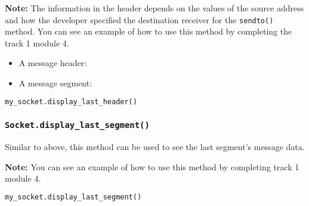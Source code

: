\documentclass[11pt]{article}
\begin{document}
\textbf{Note:}
The information in the header depends on the values of the source address and how the developer specified the destination receiver for the \texttt{sendto()} method.
You can see an example of how to use this method by completing the track 1 module 4.

\begin{itemize}
    \item A message header:

    \item A message segment:
\end{itemize}

\begin{lstlisting}[caption={Example for using \texttt{display\_last\_header()}}, language=Python]
my_socket.display_last_header()
\end{lstlisting}

\subsubsection{\texttt{Socket.display\_last\_segment()}}
Similar to above, this method can be used to see the last segment's message data.

\textbf{Note:}
You can see an example of how to use this method by completing track 1 module 4.

\begin{lstlisting}[caption={Example for using \texttt{display\_last\_segment()}}, language=Python]
my_socket.display_last_segment()
\end{lstlisting}
\end{document}
